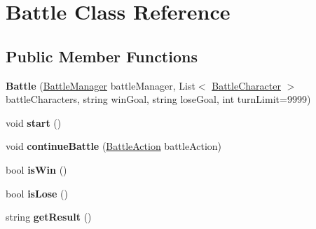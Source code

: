 \hypertarget{class_battle}{}\section{Battle Class Reference}
\label{class_battle}
\subsection*{Public Member Functions}
\begin{DoxyCompactItemize}
\item 
{\bfseries Battle} (\hyperlink{class_battle_manager}{Battle\+Manager} battle\+Manager, List$<$ \hyperlink{class_battle_character}{Battle\+Character} $>$ battle\+Characters, string win\+Goal, string lose\+Goal, int turn\+Limit=9999)\hypertarget{class_battle_a3202485f720c48d38f96d1c6d3293cff}{}\label{class_battle_a3202485f720c48d38f96d1c6d3293cff}

\item 
void {\bfseries start} ()\hypertarget{class_battle_a79a8ca3f3fce0849b51c863c5ab8be7e}{}\label{class_battle_a79a8ca3f3fce0849b51c863c5ab8be7e}

\item 
void {\bfseries continue\+Battle} (\hyperlink{class_battle_action}{Battle\+Action} battle\+Action)\hypertarget{class_battle_a8b366056bb9793923ce718f1fda42c6b}{}\label{class_battle_a8b366056bb9793923ce718f1fda42c6b}

\item 
bool {\bfseries is\+Win} ()\hypertarget{class_battle_a6cda1a6075091af8abae24cda5d54d79}{}\label{class_battle_a6cda1a6075091af8abae24cda5d54d79}

\item 
bool {\bfseries is\+Lose} ()\hypertarget{class_battle_a5fbf7b0fa022ecbea91f9af258cbb224}{}\label{class_battle_a5fbf7b0fa022ecbea91f9af258cbb224}

\item 
string {\bfseries get\+Result} ()\hypertarget{class_battle_af5634dbc4c102b64663a473b1460d707}{}\label{class_battle_af5634dbc4c102b64663a473b1460d707}

\end{DoxyCompactItemize}
